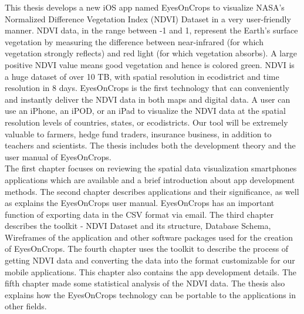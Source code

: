 
This thesis develops a new iOS app named EyesOnCrops to visualize NASA's Normalized Difference Vegetation Index (NDVI) Dataset in a very user-friendly manner. NDVI data, in the range between -1 and 1, represent the Earth’s surface vegetation by measuring the difference between near-infrared (for which vegetation strongly reflects) and red light (for which vegetation absorbs). A large positive NDVI value means good vegetation and hence is colored green. NDVI is a huge dataset of over 10 TB, with spatial resolution in ecodistrict and time resolution in 8 days. EyesOnCrops is the first technology that can conveniently and instantly deliver the NDVI data in both maps and digital data. A user can use an iPhone, an iPOD, or an iPad to visualize the NDVI data at the spatial resolution levels of countries, states, or ecodistricts. Our tool will be extremely valuable to farmers, hedge fund traders, insurance business, in addition to teachers and scientists. The thesis includes both the development theory and the user manual of EyesOnCrops. \\
The first chapter focuses on reviewing the spatial data visualization smartphones applications which are available and a brief introduction about app development methods. The second chapter describes applications and their significance, as well as explains the EyesOnCrops user manual. EyesOnCrops has an important function of exporting data in the CSV format via email. The third chapter describes the toolkit - NDVI Dataset and its structure, Database Schema, Wireframes of the application and other software packages used for the creation of EyesOnCrops. The fourth chapter uses the toolkit to describe the process of getting NDVI data and converting the data into the format customizable for our mobile applications. This chapter also contains the app development details. The fifth chapter made some statistical analysis of the NDVI data. The thesis also explains how the EyesOnCrops technology can be portable to the applications in other fields.


